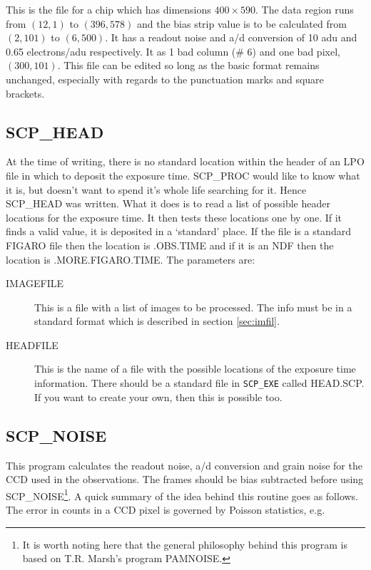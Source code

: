 This is the file for a chip which has dimensions $400 \times 590$.  The data
region runs from $(12,1)$ to $(396,578)$ and the bias strip value is to be
calculated from $(2,101)$ to $(6,500)$. It has a readout noise and a/d
conversion of 10 adu and 0.65 electrons/adu respectively.  It as 1 bad column
(\# 6) and one bad pixel, $(300,101)$.  This file can be edited so long as the
basic format remains unchanged, especially with regards to the punctuation
marks and square brackets.

\subsection{SCP\_HEAD} \label{sec:times}

At the time of writing, there is no standard location within the header of an
LPO file in which to deposit the exposure time.  SCP\_PROC would like to know
what it is, but doesn't want to spend it's whole life searching for it.  Hence
SCP\_HEAD was written.  What it does is to read a list of possible header
locations for the exposure time.  It then tests these locations one by one. If
it finds a valid value, it is deposited in a `standard' place. If the file is a
standard FIGARO file then the location is .OBS.TIME and if it is an NDF then
the location is .MORE.FIGARO.TIME.  The parameters are:

\begin{description}

\item [IMAGEFILE] This is a file with a list of images to be processed. The
info must be in a standard format which is described in section
\ref{sec:imfil}.

\item [HEADFILE] This is the name of a file with the possible locations of the
exposure time information.  There should be a standard file in {\tt SCP\_EXE}
called HEAD.SCP. If you want to create your own, then this is possible too.

\end{description}

\subsection{SCP\_NOISE}\label{sec:noise}

This program calculates the readout noise, a/d conversion and grain noise for
the CCD used in the observations.  The frames should be bias subtracted before
using SCP\_NOISE\footnote{It is worth noting here that the general philosophy
behind this program is based on T.R. Marsh's program PAMNOISE.}.   A quick
summary of the idea behind this routine goes as follows.  The error in counts
in a CCD pixel is governed by Poisson statistics, e.g.


